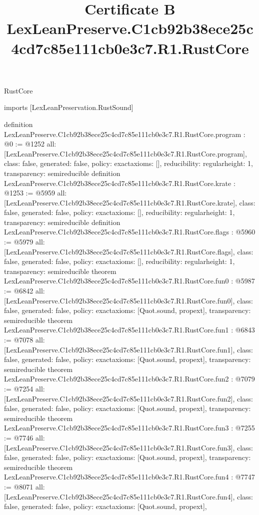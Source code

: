 \begin{lexlean}{RustCore}
\title{Certificate B LexLeanPreserve.C1cb92b38ece25c4cd7c85e111cb0e3c7.R1.RustCore}
\begin{coremodule}
imports [LexLeanPreservation.RustSound]

definition LexLeanPreserve.C1cb92b38ece25c4cd7c85e111cb0e3c7.R1.RustCore.program : @0 := @1252 {
  all: [LexLeanPreserve.C1cb92b38ece25c4cd7c85e111cb0e3c7.R1.RustCore.program],
  class: false,
  generated: false,
  policy: exact{axioms: []},
  reducibility: regular{height: 1},
  transparency: semireducible
}
definition LexLeanPreserve.C1cb92b38ece25c4cd7c85e111cb0e3c7.R1.RustCore.krate : @1253 := @5959 {
  all: [LexLeanPreserve.C1cb92b38ece25c4cd7c85e111cb0e3c7.R1.RustCore.krate],
  class: false,
  generated: false,
  policy: exact{axioms: []},
  reducibility: regular{height: 1},
  transparency: semireducible
}
definition LexLeanPreserve.C1cb92b38ece25c4cd7c85e111cb0e3c7.R1.RustCore.flags : @5960 := @5979 {
  all: [LexLeanPreserve.C1cb92b38ece25c4cd7c85e111cb0e3c7.R1.RustCore.flags],
  class: false,
  generated: false,
  policy: exact{axioms: []},
  reducibility: regular{height: 1},
  transparency: semireducible
}
theorem LexLeanPreserve.C1cb92b38ece25c4cd7c85e111cb0e3c7.R1.RustCore.fun0 : @5987 := @6842 {
  all: [LexLeanPreserve.C1cb92b38ece25c4cd7c85e111cb0e3c7.R1.RustCore.fun0],
  class: false,
  generated: false,
  policy: exact{axioms: [Quot.sound, propext]},
  transparency: semireducible
}
theorem LexLeanPreserve.C1cb92b38ece25c4cd7c85e111cb0e3c7.R1.RustCore.fun1 : @6843 := @7078 {
  all: [LexLeanPreserve.C1cb92b38ece25c4cd7c85e111cb0e3c7.R1.RustCore.fun1],
  class: false,
  generated: false,
  policy: exact{axioms: [Quot.sound, propext]},
  transparency: semireducible
}
theorem LexLeanPreserve.C1cb92b38ece25c4cd7c85e111cb0e3c7.R1.RustCore.fun2 : @7079 := @7254 {
  all: [LexLeanPreserve.C1cb92b38ece25c4cd7c85e111cb0e3c7.R1.RustCore.fun2],
  class: false,
  generated: false,
  policy: exact{axioms: [Quot.sound, propext]},
  transparency: semireducible
}
theorem LexLeanPreserve.C1cb92b38ece25c4cd7c85e111cb0e3c7.R1.RustCore.fun3 : @7255 := @7746 {
  all: [LexLeanPreserve.C1cb92b38ece25c4cd7c85e111cb0e3c7.R1.RustCore.fun3],
  class: false,
  generated: false,
  policy: exact{axioms: [Quot.sound, propext]},
  transparency: semireducible
}
theorem LexLeanPreserve.C1cb92b38ece25c4cd7c85e111cb0e3c7.R1.RustCore.fun4 : @7747 := @8071 {
  all: [LexLeanPreserve.C1cb92b38ece25c4cd7c85e111cb0e3c7.R1.RustCore.fun4],
  class: false,
  generated: false,
  policy: exact{axioms: [Quot.sound, propext]},
}
\end{coremodule}
\end{lexlean}
